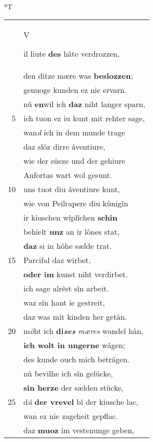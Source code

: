 \documentclass[8pt,a4paper,notitlepage]{article}
\begin{document}
\begin{table}[ht]
\begin{minipage}[t]{0.5\linewidth}
\end{minipage}
\hspace{0.5cm}
\begin{minipage}[t]{0.5\linewidth}
\small
\begin{center}*T
\end{center}
\begin{tabular}{rl}
 & \begin{Large}V\end{Large}il liute \textbf{des} hâte verdrozzen,\\ 
 & den ditze mære was \textbf{beslozzen};\\ 
 & genuoge kunden ez nie ervarn.\\ 
 & nû \textbf{en}wil ich \textbf{daz} niht langer sparn,\\ 
5 & ich tuon ez iu kunt mit rehter sage,\\ 
 & wan\textit{d} ich in dem munde trage\\ 
 & daz slôz dirre âventiure,\\ 
 & wie der süeze und der gehiure\\ 
 & Anfortas wart wol gesunt.\\ 
10 & uns tuot diu âventiure kunt,\\ 
 & wie von Peilrapere diu künigîn\\ 
 & ir kiuschen wîplîchen \textbf{schîn}\\ 
 & behielt \textbf{unz} an ir lônes stat,\\ 
 & \textbf{daz} si in hôhe sælde trat.\\ 
15 & Parcifal daz wirbet,\\ 
 & \textbf{oder im} kunst niht verdirbet.\\ 
 & ich sage alrêst sîn arbeit.\\ 
 & waz sîn hant ie gestreit,\\ 
 & daz was mit kinden her getân.\\ 
20 & m\textit{ö}ht ich \textbf{di\textit{ses}} \textit{mæres} wandel hân,\\ 
 & \textbf{ich wolt in ungerne} wâgen;\\ 
 & des kunde ouch mich betrâgen.\\ 
 & nû bevilhe ich sîn gelücke,\\ 
 & \textbf{sîn herze} der sælden stücke,\\ 
25 & d\textit{â} \textbf{der vrevel} bî der kiusche lac,\\ 
 & wan ez nie zageheit gepflac.\\ 
 & daz \textbf{muoz} im vestenunge geben,\\ 

\end{tabular}
\end{minipage}
\end{table}
\end{document}
